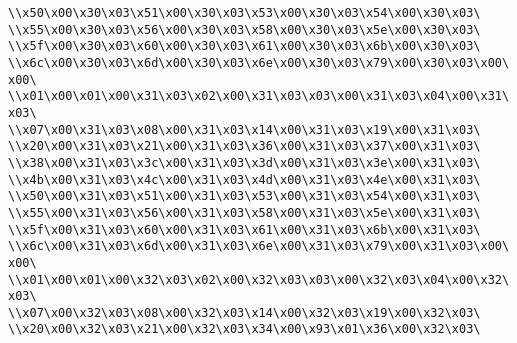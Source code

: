 \verb|\\x50\x00\x30\x03\x51\x00\x30\x03\x53\x00\x30\x03\x54\x00\x30\x03\|\newline
\verb|\\x55\x00\x30\x03\x56\x00\x30\x03\x58\x00\x30\x03\x5e\x00\x30\x03\|\newline
\verb|\\x5f\x00\x30\x03\x60\x00\x30\x03\x61\x00\x30\x03\x6b\x00\x30\x03\|\newline
\verb|\\x6c\x00\x30\x03\x6d\x00\x30\x03\x6e\x00\x30\x03\x79\x00\x30\x03\x00\x00\|\newline
\verb|\\x01\x00\x01\x00\x31\x03\x02\x00\x31\x03\x03\x00\x31\x03\x04\x00\x31\x03\|\newline
\verb|\\x07\x00\x31\x03\x08\x00\x31\x03\x14\x00\x31\x03\x19\x00\x31\x03\|\newline
\verb|\\x20\x00\x31\x03\x21\x00\x31\x03\x36\x00\x31\x03\x37\x00\x31\x03\|\newline
\verb|\\x38\x00\x31\x03\x3c\x00\x31\x03\x3d\x00\x31\x03\x3e\x00\x31\x03\|\newline
\verb|\\x4b\x00\x31\x03\x4c\x00\x31\x03\x4d\x00\x31\x03\x4e\x00\x31\x03\|\newline
\verb|\\x50\x00\x31\x03\x51\x00\x31\x03\x53\x00\x31\x03\x54\x00\x31\x03\|\newline
\verb|\\x55\x00\x31\x03\x56\x00\x31\x03\x58\x00\x31\x03\x5e\x00\x31\x03\|\newline
\verb|\\x5f\x00\x31\x03\x60\x00\x31\x03\x61\x00\x31\x03\x6b\x00\x31\x03\|\newline
\verb|\\x6c\x00\x31\x03\x6d\x00\x31\x03\x6e\x00\x31\x03\x79\x00\x31\x03\x00\x00\|\newline
\verb|\\x01\x00\x01\x00\x32\x03\x02\x00\x32\x03\x03\x00\x32\x03\x04\x00\x32\x03\|\newline
\verb|\\x07\x00\x32\x03\x08\x00\x32\x03\x14\x00\x32\x03\x19\x00\x32\x03\|\newline
\verb|\\x20\x00\x32\x03\x21\x00\x32\x03\x34\x00\x93\x01\x36\x00\x32\x03\|\newline
